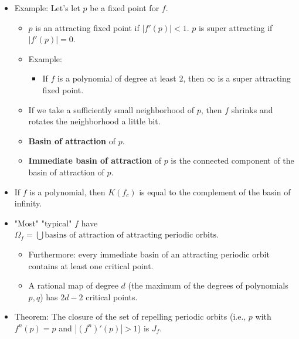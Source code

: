 \documentclass[../apprentice.tex]{subfiles}
\begin{document}
\begin{itemize}
    \item Example: Let's let $p$ be a fixed point for $f$.
    \begin{itemize}
        \item $p$ is an attracting fixed point if $|f'(p)|<1$. $p$ is super attracting if $|f'(p)|=0$.
        \item Example:
        \begin{itemize}
            \item If $f$ is a polynomial of degree at least 2, then $\infty$ is a super attracting fixed point.
        \end{itemize}
        \item If we take a sufficiently small neighborhood of $p$, then $f$ shrinks and rotates the neighborhood a little bit.
        \item \textbf{Basin of attraction} of $p$.
        \item \textbf{Immediate basin of attraction} of $p$ is the connected component of the basin of attraction of $p$.
    \end{itemize}
    \item If $f$ is a polynomial, then $K(f_c)$ is equal to the complement of the basin of infinity.
    \item "Most" "typical" $f$ have $\Omega_f=\bigcup\text{basins of attraction of attracting periodic orbits}$.
    \begin{itemize}
        \item Furthermore: every immediate basin of an attracting periodic orbit contains at least one critical point.
        \item A rational map of degree $d$ (the maximum of the degrees of polynomials $p,q$) has $2d-2$ critical points.
    \end{itemize}
    \item Theorem: The closure of the set of repelling periodic orbits (i.e., $p$ with $f^n(p)=p$ and $|(f^n)'(p)|>1$) is $J_f$.
\end{itemize}
\end{document}
